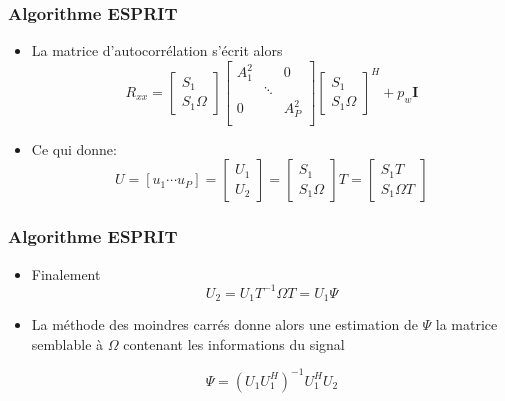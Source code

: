 \documentclass[10pt]{beamer}
\begin{document}
\begin{frame}
%
\frametitle{Algorithme ESPRIT}
\begin{itemize}
  
  \item La matrice d'autocorrélation s'écrit alors
  \begin{equation}
R_{xx} = \begin{bmatrix} S_1 \\ S_1 \Omega \end{bmatrix}
\begin{bmatrix} A_1^2 & & \text{0}\\ &  \ddots \\ \text{0} & & A_P^2 \\ \end{bmatrix}
\begin{bmatrix}   S_1 \\ S_1 \Omega \end{bmatrix}^H  + p_w\boldsymbol{I}
\end{equation}

\item Ce qui donne:
\begin{equation}
U = [u_1 \cdots u_P] = \begin{bmatrix} U_1 \\ U_2 \end{bmatrix} = \begin{bmatrix} S_1 \\ S_1 \Omega \end{bmatrix} T = \begin{bmatrix} S_1 T \\ S_1 \Omega T \end{bmatrix}
\end{equation}
\end{itemize}

\end{frame}


\begin{frame}
%
\frametitle{Algorithme ESPRIT}
\begin{itemize}
  
  \item Finalement
  \begin{equation}
U_2 = U_1 T^{-1} \Omega T = U_1 \Psi
\end{equation}

\item La méthode des moindres carrés donne alors une estimation de \( \Psi\) la matrice semblable à \( \Omega\) contenant les informations du signal

\begin{equation}
\Psi = (U_1 U_1^H)^{-1} U_1^H U_2
\end{equation}

\end{itemize}

\end{frame}
\end{document}
